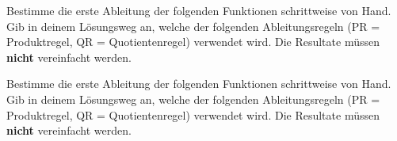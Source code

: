 \documentclass[11pt]{exam}
\begin{document}
\begin{questions}


\noaddpoints
\question[\totalpoints]
\addpoints
Bestimme die erste Ableitung der folgenden Funktionen schrittweise von Hand. Gib in deinem Lösungsweg an, welche der folgenden Ableitungsregeln (PR =  Produktregel, QR = Quotientenregel) verwendet wird. Die Resultate müssen \textbf{nicht} vereinfacht werden.


\noaddpoints
\question[\totalpoints]
\addpoints
Bestimme die erste Ableitung der folgenden Funktionen schrittweise von Hand. Gib in deinem Lösungsweg an, welche der folgenden Ableitungsregeln (PR =  Produktregel, QR = Quotientenregel) verwendet wird. Die Resultate müssen \textbf{nicht} vereinfacht werden.
\end{questions}
\end{document}
